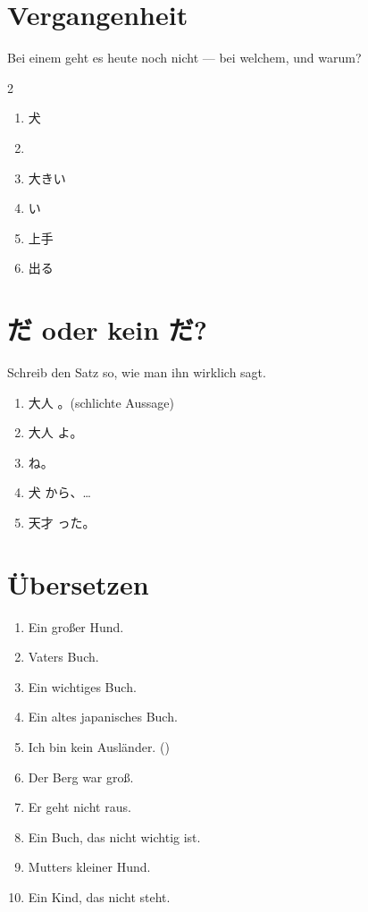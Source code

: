 \documentclass[11pt,a4paper,DIV=12]{scrartcl}
\begin{document}
\section{Vergangenheit}

Bei einem geht es heute noch nicht — bei welchem, und warum?

\begin{multicols}{2}
\begin{enumerate}[itemsep=6pt]
\item 犬 \hfill \lin[2.5cm]
\item {} \hfill \lin[2.5cm]
\item 大きい \hfill \lin[2.5cm]
\item {}い \hfill \lin[2.5cm]
\item 上手 \hfill \lin[2.5cm]
\item 出る \hfill \lin[2.5cm]
\end{enumerate}
\end{multicols}

\section{だ oder kein だ?}

Schreib den Satz so, wie man ihn wirklich sagt.

\begin{enumerate}[itemsep=6pt]
\item 大人 \lin[1cm]。\quad \textnormal{(schlichte Aussage)}
\item 大人 \lin[1cm] よ。
\item {} \lin[1cm] ね。
\item 犬 \lin[1cm] から、…
\item 天才 \lin[1cm] った。
\end{enumerate}

\section{Übersetzen}

\begin{enumerate}[itemsep=8pt]
\item Ein großer Hund. \hfill \lin[8cm]
\item Vaters Buch. \hfill \lin[8cm]
\item Ein wichtiges Buch. \hfill \lin[8cm]
\item Ein altes japanisches Buch. \hfill \lin[8cm]
\item Ich bin kein Ausländer. \textnormal{()} \hfill \lin[8cm]
\item Der Berg war groß. \hfill \lin[8cm]
\item Er geht nicht raus. \hfill \lin[8cm]
\item Ein Buch, das nicht wichtig ist. \hfill \lin[8cm]
\item Mutters kleiner Hund. \hfill \lin[8cm]
\item Ein Kind, das nicht steht. \hfill \lin[8cm]
\end{enumerate}
\end{document}

